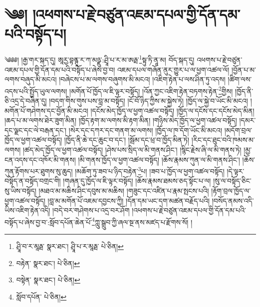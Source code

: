\setcounter{footnote}{0} 
\chapter{༄༅། །འཕགས་པ་རྗེ་བཙུན་འཇམ་དཔལ་གྱི་དོན་དམ་པའི་བསྟོད་པ།}༄༅༅། །རྒྱ་གར་སྐད་དུ། ཨཱརྱ་བྷནྚཱ་ར་ཀ་མཉྫུ་:ཤྲཱི་པ་ར་མ་ཨརྠ་\footnote{ཤྲཱི་བ་ར་མཱརྠ་  སྣར་ཐང་། ཤྲཱི་པ་ར་མཱརྠ་  པེ་ཅིན། }སྟུ་ཏི་ནཱ་མ། བོད་སྐད་དུ། འཕགས་པ་རྗེ་བཙུན་འཇམ་དཔལ་གྱི་དོན་དམ་པའི་བསྟོད་པ་ཞེས་བྱ་བ། འཇམ་དཔལ་གཞོན་ནུར་གྱུར་པ་ལ་ཕྱག་འཚལ་ལོ། །བྱོན་པ་མ་ལགས་བཞུད་མི་མངའ། །བཞེངས་པ་མ་ལགས་བཞུགས་མི་མངའ། །འཇིག་རྟེན་པ་ལས་ཤིན་ཏུ་འདས། །ཚིག་ལས་འདས་པའི་སྤྱོད་ཡུལ་ལགས། །མགོན་པོ་ཁྱོད་ལ་ཇི་ལྟར་བསྟོད། །འོན་ཀྱང་འཇིག་རྟེན་བཏགས་རྟེན་\footnote{བརྟེན་  སྣར་ཐང་།  པེ་ཅིན། }གྱིས། །ཁྱོད་ནི་ཅི་འདྲ་དེ་བཞིན་དུ། །བདག་གིས་གུས་པས་བླ་མ་བསྟོད། །ངོ་བོ་ཉིད་ཀྱིས་མ་སྐྱེས་ཏེ། །ཁྱོད་ལ་སྐྱེ་བ་ཡོང་མི་མངའ། །མགོན་པོ་གཤེགས་དང་བྱོན་མི་མངའ། །དངོས་མེད་ཁྱོད་ལ་ཕྱག་འཚལ་བསྟོད། །ཁྱོད་ལ་དངོས་དང་དངོས་མེད་མིན། །ཆད་པ་མ་ལགས་ཐེར་ཟུག་མིན། །ཁྱོད་རྟག་མ་ལགས་མི་རྟག་མིན། །གཉིས་མེད་ཁྱོད་ལ་ཕྱག་འཚལ་བསྟོད། །དམར་དང་ལྗང་དང་ལེ་བརྒན་དང་། །སེར་དང་དཀར་དང་གནག་མ་ལགས། །ཁྱོད་ལ་ཁ་དོག་ཡོང་མི་མངའ། །མདོག་བྲལ་ཁྱོད་ལ་ཕྱག་འཚལ་བསྟོད། །ཁྱོད་ནི་ཆེ་དང་ཆུང་བ་དང་། །སྦོམ་དང་ཕྲ་བ་ཁྱོད་མིན་ཏེ། །རིང་དང་ཐུང་བའི་ཁམས་མ་ལགས། །ཚད་མེད་ཁྱོད་ལ་ཕྱག་འཚལ་བསྟོད། །ཤེས་པས་སྲིད་ལ་མི་གནས་ཤིང་། །སྙིང་རྗེས་ཞི་ལ་མི་གནས་ཏེ། །མྱ་ངན་འདས་དང་འཁོར་མི་གནས། །མི་གནས་ཁྱོད་ལ་ཕྱག་འཚལ་བསྟོད། །ཆོས་རྣམས་ཀུན་ལ་མི་གནས་ཤིང་། །ཆོས་ཀུན་རྟོགས་པར་ཐུགས་སུ་ཆུད། །མཆོག་ཏུ་ཟབ་པ་ཉིད་བརྟེན་\footnote{བསྟེན་  སྣར་ཐང་།  པེ་ཅིན། }པ། །ཟབ་པ་ཁྱོད་ལ་ཕྱག་འཚལ་བསྟོད། །དེ་ལྟར་བསྟོད་ན་བསྟོད་བགྲང་གི། །གཞན་དུ་ཁྱོད་ལ་ཇི་ལྟར་བསྟོད། །ཆོས་རྣམས་ཐམས་ཅད་སྟོང་པ་ལ། །སུ་ལ་བསྟོད་ཅིང་སུ་ཡིས་བསྟོད། །མཐའ་མ་མཆིས་ཤིང་དབུས་མ་མཆིས། །གཟུང་དང་འཛིན་པ་རྣམ་སྤངས་པའི། །རྟོག་བྲལ་ཁྱོད་ལ་ཕྱག་འཚལ་བསྟོད། །བླ་མ་མགོན་པོ་འཇམ་དབྱངས་ཀྱི། །དོན་དམ་ཡང་དག་མཚན་བརྗོད་པའི། །བསོད་ནམས་འདི་ཡིས་འཇིག་རྟེན་འདི། །བདེ་བར་གཤེགས་པ་འདྲ་བར་ཤོག །འཕགས་པ་རྗེ་བཙུན་འཇམ་དཔལ་གྱི་དོན་དམ་པའི་བསྟོད་པ་ཞེས་བྱ་བ་:སློབ་དཔོན་ཆེན་པོ་\footnote{སློབ་དཔོན་  པེ་ཅིན། }ཀླུ་སྒྲུབ་ཀྱི་ཞལ་སྔ་ནས་མཛད་པ་རྫོགས་སོ། ། 